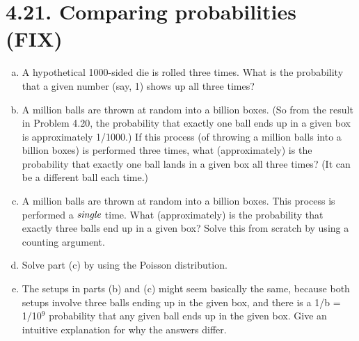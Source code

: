 \section*{4.21. Comparing probabilities (FIX)}
\begin{enumerate}[(a)]
    \item A hypothetical 1000-sided die is rolled three times. What is the probability
        that a given number (say, 1) shows up all three times?

    \item A million balls are thrown at random into a billion boxes. (So from 
        the result in Problem 4.20, the probability that exactly 
        one ball ends up in a given box is approximately 1/1000.)
        If this process (of throwing a million balls into a billion
        boxes) is performed three times, what (approximately) is the probability
        that exactly one ball lands in a given box all three times?
        (It can be a different ball each time.)

    \item A million balls are thrown at random into a billion boxes. This process
        is performed a $\emph{single}$ time. What (approximately) is the 
        probability that exactly three balls end up in a given box?
        Solve this from scratch by using a counting argument.

    \item Solve part (c) by using the Poisson distribution.

    \item The setups in parts (b) and (c) might seem basically the same,
        because both setups involve three balls ending up in the given
        box, and there is a 1/b = 1/10$^9$ probability that any given ball
        ends up in the given box. Give an intuitive explanation
        for why the answers differ.
\end{enumerate}

\vspace{1em}

